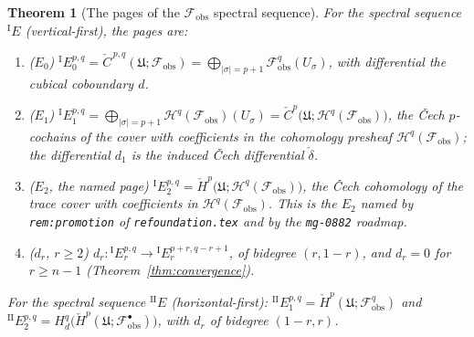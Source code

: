 \documentclass[11pt,oneside]{amsart}
\theoremstyle{plain}
\newtheorem{theorem}{Theorem}[section]
\theoremstyle{definition}
\theoremstyle{remark}
\theoremstyle{honeststyle}
\newcommand{\fobs}{\mathcal{F}_{\mathrm{obs}}}
\newcommand{\Uf}{\mathfrak{U}}
\newcommand{\Ccheck}{\check{C}}
\begin{document}
\begin{theorem}[The pages of the $\fobs$ spectral sequence]
\label{thm:pages}
For the spectral sequence ${}^{\mathrm{I}}E$ (vertical-first), the
pages are:
\begin{enumerate}[label=\textup{(\arabic*)},leftmargin=2.4em]
\item \textup{($E_{0}$)} ${}^{\mathrm{I}}E_{0}^{p,q}=
  \Ccheck^{\,p,q}(\Uf;\fobs)=\bigoplus_{|\sigma|=p+1}\fobs^{q}
  (U_{\sigma})$, with differential the cubical coboundary $d$.
\item \textup{($E_{1}$)} ${}^{\mathrm{I}}E_{1}^{p,q}=
  \bigoplus_{|\sigma|=p+1}\mathcal H^{q}(\fobs)(U_{\sigma})
  =\check C^{p}\bigl(\Uf;\mathcal H^{q}(\fobs)\bigr)$, the \v{C}ech
  $p$-cochains of the cover with coefficients in the cohomology
  presheaf $\mathcal H^{q}(\fobs)$; the differential $d_{1}$ is the
  induced \v{C}ech differential $\check\delta$.
\item \textup{($E_{2}$, the named page)} ${}^{\mathrm{I}}E_{2}^{p,q}=
  \check H^{p}\bigl(\Uf;\mathcal H^{q}(\fobs)\bigr)$, the \v{C}ech
  cohomology of the trace cover with coefficients in $\mathcal
  H^{q}(\fobs)$. This is the $E_{2}$ named by \texttt{rem:promotion}
  of \texttt{refoundation.tex} and by the \texttt{mg-0882} roadmap.
\item \textup{($d_{r}$, $r\ge2$)} $d_{r}\colon
  {}^{\mathrm{I}}E_{r}^{p,q}\to{}^{\mathrm{I}}E_{r}^{p+r,q-r+1}$, of
  bidegree $(r,1-r)$, and $d_{r}=0$ for $r\ge n-1$
  (Theorem~\ref{thm:convergence}).
\end{enumerate}
For the spectral sequence ${}^{\mathrm{II}}E$ (horizontal-first):
${}^{\mathrm{II}}E_{1}^{p,q}=\check H^{p}(\Uf;\fobs^{q})$ and
${}^{\mathrm{II}}E_{2}^{p,q}=H^{q}_{d}\bigl(\check H^{p}(\Uf;
\fobs^{\bullet})\bigr)$, with $d_{r}$ of bidegree $(1-r,r)$.
\end{theorem}
\end{document}
